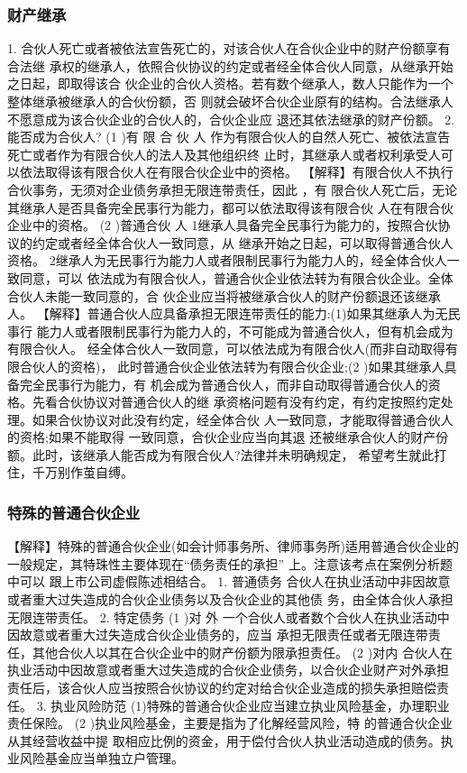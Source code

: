 \documentclass[UTF8,12pt]{ctexart}
\numberwithin{equation}{section} %
\numberwithin{figure}{section}
\numberwithin{table}{section}
\begin{document}
	\subsubsection{财产继承}
	1. 合伙人死亡或者被依法宣告死亡的，对该合伙人在合伙企业中的财产份额享有合法继 承权的继承人，依照合伙协议的约定或者经全体合伙人同意，从继承开始之日起，即取得该合 伙企业的合伙人资格。若有数个继承人，数人只能作为一个整体继承被继承人的合伙份额，否 则就会破坏合伙企业原有的结构。合法继承人不愿意成为该合伙企业的合伙人的，合伙企业应 退还其依法继承的财产份额。
	2. 能否成为合伙人?
	(1 )有 限 合 伙 人 作为有限合伙人的自然人死亡、被依法宣告死亡或者作为有限合伙人的法人及其他组织终 止时，其继承人或者权利承受人可以依法取得该有限合伙人在有限合伙企业中的资格。
	【解释】有限合伙人不执行合伙事务，无须对企业债务承担无限连带责任，因此 ，有 限合伙人死亡后，无论其继承人是否具备完全民事行为能力，都可以依法取得该有限合伙 人在有限合伙企业中的资格。
	(2 )普通合伙 人 1继承人具备完全民事行为能力的，按照合伙协议的约定或者经全体合伙人一致同意，从 继承开始之日起，可以取得普通合伙人资格。 2继承人为无民事行为能力人或者限制民事行为能力人的，经全体合伙人一致同意，可以 依法成为有限合伙人，普通合伙企业依法转为有限合伙企业。全体合伙人未能一致同意的，合 伙企业应当将被继承合伙人的财产份额退还该继承人。
	【解释】普通合伙人应具备承担无限连带责任的能力:(1)如果其继承人为无民事行 能力人或者限制民事行为能力人的，不可能成为普通合伙人，但有机会成为有限合伙人。
	经全体合伙人一致同意，可以依法成为有限合伙人(而非自动取得有限合伙人的资格)， 此时普通合伙企业依法转为有限合伙企业;(2 )如果其继承人具备完全民事行为能力，有 机会成为普通合伙人，而非自动取得普通合伙人的资格。先看合伙协议对普通合伙人的继 承资格问题有没有约定，有约定按照约定处理。如果合伙协议对此没有约定，经全体合伙 人一致同意，才能取得普通合伙人的资格;如果不能取得 一致同意，合伙企业应当向其退 还被继承合伙人的财产份额。此时，该继承人能否成为有限合伙人?法律并未明确规定， 希望考生就此打住，千万别作茧自缚。
	
	
	\subsubsection{特殊的普通合伙企业}
	【解释】特殊的普通合伙企业(如会计师事务所、律师事务所)适用普通合伙企业的 一般规定，其特珠性主要体现在“债务责任的承担” 上。注意该考点在案例分析题中可以 跟上市公司虚假陈述相结合。
	1. 普通债务 合伙人在执业活动中非因故意或者重大过失造成的合伙企业债务以及合伙企业的其他债 务，由全体合伙人承担无限连带责任。
	2. 特定债务
	(1 )对 外 一个合伙人或者数个合伙人在执业活动中因故意或者重大过失造成合伙企业债务的，应当 承担无限责任或者无限连带责任，其他合伙人以其在合伙企业中的财产份额为限承担责任。 (2 )对内
	合伙人在执业活动中因故意或者重大过失造成的合伙企业债务，以合伙企业财产对外承担 责任后，该合伙人应当按照合伙协议的约定对给合伙企业造成的损失承担赔偿责任。
	3. 执业风险防范
	(1)特殊的普通合伙企业应当建立执业风险基金，办理职业责任保险。
	(2 )执业风险基金，主要是指为了化解经营风险，特 的普通合伙企业从其经营收益中提 取相应比例的资金，用于偿付合伙人执业活动造成的债务。执业风险基金应当单独立户管理。
	 
\end{document}

